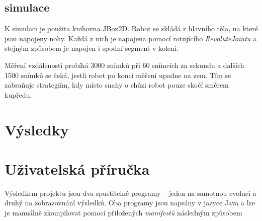 \documentclass[a4]{article}
\begin{document}
\subsection{simulace}
K simulaci je použita knihovna JBox2D\cite{jbox2D}. Robot se skládá z hlavního těla, na které jsou napojeny nohy. Každá z nich je napojena pomocí rotujícího \emph{RevoluteJointu} a stejným způsobem je napojen i spodní segment v koleni.\par
Měření vzdálenosti probíhá 3000 snímků při 60 snímcích za sekundu a dalších 1500 snímků se čeká, jestli robot po konci měření upadne na zem. Tím se zabraňuje strategiím, kdy místo snahy o chůzi robot pouze skočí směrem kupředu.\par
\section{Výsledky} 
\section{Uživatelská příručka}
Výsledkem projektu jsou dva spustitelné programy -- jeden na samotnou evoluci a druhý na zobrazovnání výsledků. Oba programy jsou napsány v jazyce Java a lze je manuálně zkompilovat pomocí přiložených \emph{manifestů} následným způsobem
\end{document}
